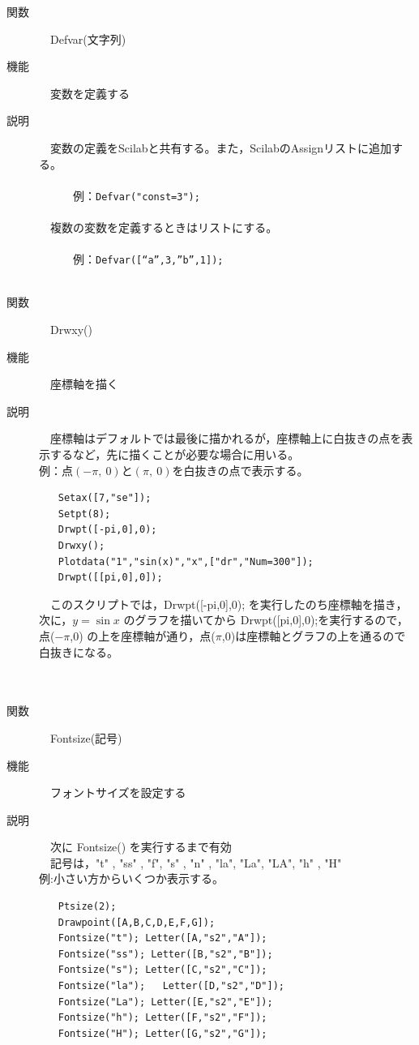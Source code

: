 \documentclass[papersize,a4paper,12pt,uplatex]{jsarticle}
\begin{document}
\begin{description}
\hypertarget{defvar}{}
\item[関数]　Defvar(文字列)
\item[機能]　変数を定義する
\item[説明]　変数の定義をScilabと共有する。また，ScilabのAssignリストに追加する。\\
　\\
　　　例：\verb|Defvar("const=3");|\\
　\\
　複数の変数を定義するときはリストにする。\\
　\\
　　　例：\verb|Defvar([“a”,3,”b”,1]);|\\
　\\
\hypertarget{drwxy}{}
\item[関数]　Drwxy()
\item[機能]　座標軸を描く
\item[説明]　座標軸はデフォルトでは最後に描かれるが，座標軸上に白抜きの点を表示するなど，先に描くことが必要な場合に用いる。\\

例：点$(-\pi,\ 0)$と$(\pi,\ 0)$を白抜きの点で表示する。
\begin{verbatim}
　　Setax([7,"se"]);
　　Setpt(8);
　　Drwpt([-pi,0],0);
　　Drwxy();
　　Plotdata("1","sin(x)","x",["dr","Num=300"]);
　　Drwpt([[pi,0],0]);
\end{verbatim}

　このスクリプトでは，Drwpt([-pi,0],0); を実行したのち座標軸を描き，次に，$y=\sin x$ のグラフを描いてから Drwpt([pi,0],0);を実行するので，点($-\pi$,0) の上を座標軸が通り，点($\pi$,0)は座標軸とグラフの上を通るので白抜きになる。\\


　\\
　\\
\hypertarget{fontsize}{}
\item[関数]　Fontsize(記号)
\item[機能]　フォントサイズを設定する
\item[説明]　次に Fontsize() を実行するまで有効\\
　記号は，"t" , "ss" , "f", "s" , "n" , "la",  "La", "LA", "h" , "H"\\

例:小さい方からいくつか表示する。
\begin{verbatim}
　　Ptsize(2);
　　Drawpoint([A,B,C,D,E,F,G]);
　　Fontsize("t"); Letter([A,"s2","A"]);
　　Fontsize("ss"); Letter([B,"s2","B"]);
　　Fontsize("s"); Letter([C,"s2","C"]);
　　Fontsize("la"); 	Letter([D,"s2","D"]);
　　Fontsize("La"); Letter([E,"s2","E"]);
　　Fontsize("h"); Letter([F,"s2","F"]);
　　Fontsize("H"); Letter([G,"s2","G"]);
\end{verbatim}
　　


\end{description}
\end{document}
